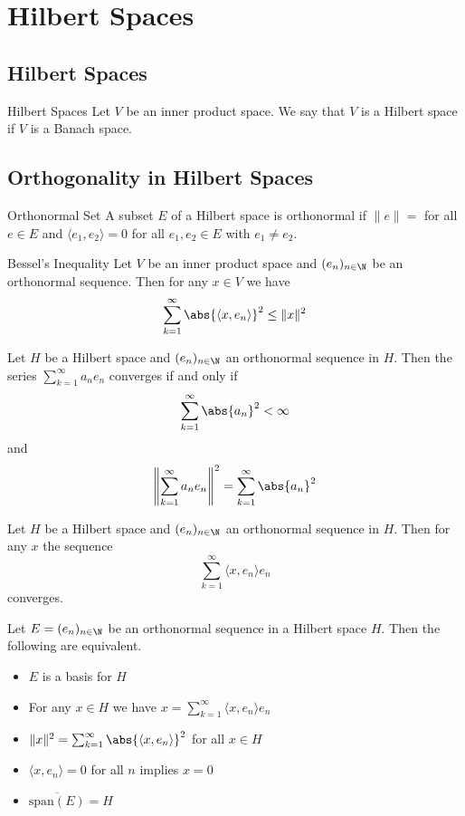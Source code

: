 \documentclass[a4paper]{article}
\begin{document}
\pagebreak
\section{Hilbert Spaces}
\subsection{Hilbert Spaces}
\begin{defn}{Hilbert Spaces}{} Let $V$ be an inner product space. We say that $V$ is a Hilbert space if $V$ is a Banach space. 
\end{defn}

\subsection{Orthogonality in Hilbert Spaces}
\begin{defn}{Orthonormal Set}{} A subset $E$ of a Hilbert space is orthonormal if $\|e\|=$ for all $e\in E$ and $\langle e_1,e_2\rangle=0$ for all $e_1,e_2\in E$ with $e_1\neq e_2$. 
\end{defn}

\begin{lmm}{Bessel's Inequality}{} Let $V$ be an inner product space and $(e_n)_{n\in\N}$ be an orthonormal sequence. Then for any $x\in V$ we have $$\sum_{k=1}^\infty\abs{\langle x,e_n\rangle}^2\leq \|x\|^2$$
\end{lmm}

\begin{lmm}{}{} Let $H$ be a Hilbert space and $(e_n)_{n\in\N}$ an orthonormal sequence in $H$. Then the series $\sum_{k=1}^\infty a_ne_n$ converges if and only if $$\sum_{k=1}^\infty\abs{a_n}^2<\infty$$ and $$\left\|\sum_{k=1}^\infty a_ne_n\right\|^2=\sum_{k=1}^\infty\abs{a_n}^2$$
\end{lmm}

\begin{crl}{}{} Let $H$ be a Hilbert space and $(e_n)_{n\in\N}$ an orthonormal sequence in $H$. Then for any $x$ the sequence $$\sum_{k=1}^\infty\langle x,e_n\rangle e_n$$ converges. 
\end{crl}

\begin{prp}{}{} Let $E=(e_n)_{n\in\N}$ be an orthonormal sequence in a Hilbert space $H$. Then the following are equivalent. 
\begin{itemize}
\item $E$ is a basis for $H$
\item For any $x\in H$ we have $x=\sum_{k=1}^\infty\langle x,e_n\rangle e_n$
\item $\|x\|^2=\sum_{k=1}^\infty\abs{\langle x,e_n\rangle}^2$ for all $x\in H$
\item $\langle x,e_n\rangle=0$ for all $n$ implies $x=0$
\item $\overline{\text{span}(E)}=H$
\end{itemize}
\end{prp}
\end{document}
